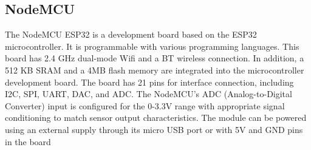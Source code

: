 \subsection{NodeMCU}
The NodeMCU ESP32 is a development board based on the ESP32
microcontroller. It is programmable with various programming
languages. This board has 2.4 GHz dual-mode Wifi and a BT wireless
connection. In addition, a 512 KB SRAM and a 4MB flash memory are
integrated into the microcontroller development board. The board has
21 pins for interface connection, including I2C, SPI, UART, DAC, and
ADC. The NodeMCU's ADC (Analog-to-Digital Converter) input is
configured for the 0-3.3V range with appropriate signal conditioning
to match sensor output characteristics.  The module can be powered
using an external supply through its micro USB port or with 5V and
GND pins in the board
